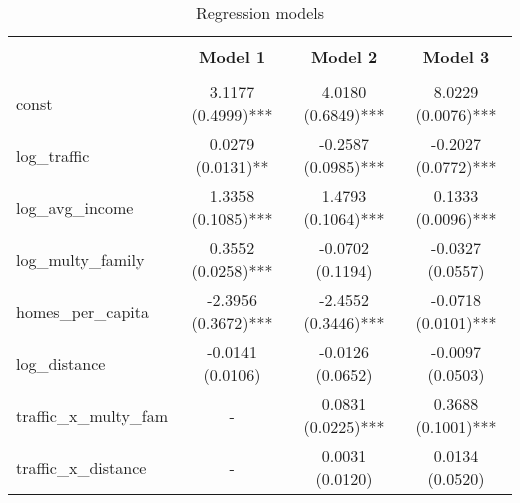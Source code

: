 
    \begin{table}
        \centering
        \caption{Regression models}
        \vspace{10pt}
        \label{tab:regression_models}
        \begin{tabular}{lccc}
        \hline
        \hline \\[-1.8ex]
     & \textbf{Model 1} & \textbf{Model 2} & \textbf{Model 3} \\
\hline \\[-1.8ex] 
const & 3.1177 (0.4999)*** & 4.0180 (0.6849)*** & 8.0229 (0.0076)*** \\
log\_traffic & 0.0279 (0.0131)** & -0.2587 (0.0985)*** & -0.2027 (0.0772)*** \\
log\_avg\_income & 1.3358 (0.1085)*** & 1.4793 (0.1064)*** & 0.1333 (0.0096)*** \\
log\_multy\_family & 0.3552 (0.0258)*** & -0.0702 (0.1194) & -0.0327 (0.0557) \\
homes\_per\_capita & -2.3956 (0.3672)*** & -2.4552 (0.3446)*** & -0.0718 (0.0101)*** \\
log\_distance & -0.0141 (0.0106) & -0.0126 (0.0652) & -0.0097 (0.0503) \\
traffic\_x\_multy\_fam & - & 0.0831 (0.0225)*** & 0.3688 (0.1001)*** \\
traffic\_x\_distance & - & 0.0031 (0.0120) & 0.0134 (0.0520) \\

        \hline
        \hline
        \end{tabular}
    \end{table}
    